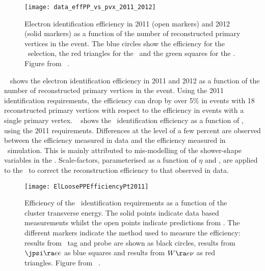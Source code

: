 \begin{figure}[h]
\centering
            \texttt{[image: data\_effPP\_vs\_pvx\_2011\_2012]}
\caption[Electron identification efficiency in 2011 and 2012
 as a function of the number of reconstructed primary vertices in
the event.]{Electron identification efficiency in 2011 (open markers) and 2012
(solid markers) as a function of the number of reconstructed primary vertices in
the event. The blue circles show the efficiency for the \loosePP\ selection, the
red triangles for the \mediumPP\ and the green squares for the \tightPP. 
Figure
from
~\cite{EfficiencyPileup}.
}
\label{fig:el-id-eff-npv}
\end{figure}

~ shows the electron identification efficiency in 2011 and 2012
as a function of the number of reconstructed primary vertices in the event.
Using the 2011 identification requirements, the efficiency can drop by over 5\%
in events with 18 reconstructed primary vertices with respect to the efficiency
in events with a single primary vertex.
~ shows the \loosePP\ identification efficiency as a function
of \et, using the 2011 requirements. Differences at the level of a
few percent are observed between the efficiency measured in data and the
efficiency measured in \mc\ simulation. This is mainly attributed to mis-modelling
of the shower-shape variables in the \mc.
Scale-factors, parameterised as a function of $\eta$ and \et, are applied to
the \mc\ to correct the reconstruction efficiency to that observed in
data.


\begin{figure}[h]
\centering
            \texttt{[image: ElLoosePPEfficiencyPt2011]}
\caption[Efficiency of
the \loosePP\ identification requirements as a function of the cluster transverse
energy.]{
Efficiency of
the \loosePP\ identification requirements as a function of the cluster transverse
energy. The solid points indicate data based measurements whilst the open points
indicate predictions from \mc. The different markers indicate the method used to
measure the efficiency: results from \Zee\ tag and probe are shown as black
circles, results from $\jpsi \ra ee$ as blue squares and results from $W \ra e
\nu$ as red triangles.
Figure
from
~\cite{ElectronEfficiency2011}.
}
\label{fig:el-id-eff-et}
\end{figure}


